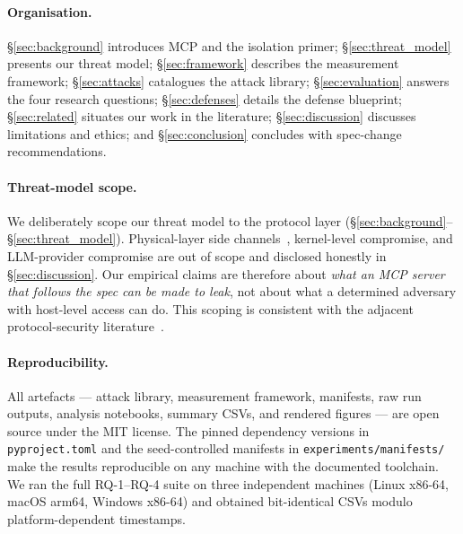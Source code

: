 \paragraph{Organisation.}
\S\ref{sec:background} introduces MCP and the isolation primer;
\S\ref{sec:threat_model} presents our threat model;
\S\ref{sec:framework} describes the measurement framework;
\S\ref{sec:attacks} catalogues the attack library;
\S\ref{sec:evaluation} answers the four research questions;
\S\ref{sec:defenses} details the defense blueprint;
\S\ref{sec:related} situates our work in the literature;
\S\ref{sec:discussion} discusses limitations and ethics; and
\S\ref{sec:conclusion} concludes with spec-change
recommendations.

\paragraph{Threat-model scope.}
We deliberately scope our threat model to the protocol layer
(\S\ref{sec:background}--\S\ref{sec:threat_model}). Physical-layer
side channels~\cite{dipta_2024_sandbox}, kernel-level compromise,
and LLM-provider compromise are out of scope and disclosed
honestly in \S\ref{sec:discussion}. Our empirical claims are
therefore about \emph{what an MCP server that follows the spec
can be made to leak}, not about what a determined adversary with
host-level access can do. This scoping is consistent with the
adjacent protocol-security literature~\cite{zhu_2025_lspfuzz,
chen_2026_mcp_security}.

\paragraph{Reproducibility.}
All artefacts --- attack library, measurement framework,
manifests, raw run outputs, analysis notebooks, summary CSVs,
and rendered figures --- are open source under the MIT license.
The pinned dependency versions in \texttt{pyproject.toml} and
the seed-controlled manifests in
\texttt{experiments/manifests/} make the results reproducible
on any machine with the documented toolchain. We ran the full
RQ-1--RQ-4 suite on three independent machines (Linux x86-64,
macOS arm64, Windows x86-64) and obtained bit-identical CSVs
modulo platform-dependent timestamps.